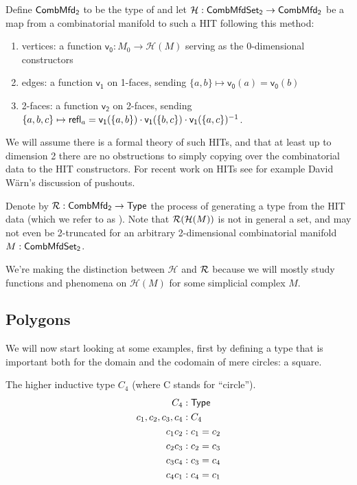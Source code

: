 \begin{mydef}
Define \( \mathsf{CombMfd_2} \) to be the type of  and let \( \mathcal{H}:\mathsf{CombMfdSet_2}\to\mathsf{CombMfd_2} \) be a map from a combinatorial manifold to such a HIT following this method:
\begin{enumerate}
\item vertices: a function \( \mathsf{v_0}:M_0\to \mathcal{H}(M) \) serving as the 0-dimensional constructors
\item edges: a function \( \mathsf{v_1} \) on 1-faces, sending \( \{a, b\}\mapsto \mathsf{v_0}(a)=\mathsf{v_0}(b) \)
\item 2-faces: a function \( \mathsf{v_2} \) on 2-faces, sending \( \{a, b, c\}\mapsto \mathsf{refl}_a = \mathsf{v_1}(\{a, b\})\cdot \mathsf{v_1}(\{b, c\})\cdot \mathsf{v_1}(\{a, c\})^{-1} \).
\end{enumerate}
\end{mydef}

We will assume there is a formal theory of such HITs, and that at least up to dimension 2 there are no obstructions to simply copying over the combinatorial data to the HIT constructors. For recent work on HITs see for example David Wärn's discussion of pushouts\cite{warn_pushouts}.

\begin{mydef}
Denote by \( \mathcal{R}:\mathsf{CombMfd_2}\to\mathsf{Type} \) the process of generating a type from the HIT data (which we refer to as ). Note that \( \mathcal{R}(\mathcal{H}(M)) \) is not in general a set, and may not even be 2-truncated for an arbitrary 2-dimensional combinatorial manifold \( M:\mathsf{CombMfdSet_2} \).
\end{mydef}

We're making the distinction between \( \mathcal{H} \) and \( \mathcal{R} \) because we will mostly study functions and phenomena on \( \mathcal{H}(M) \) for some simplicial complex \( M \).

\subsection{Polygons}\label{sec:polygons}

We will now start looking at some examples, first by defining a type that is important both for the domain and the codomain of mere circles: a square.

\begin{mydef}
The higher inductive type \( C_4 \) (where C stands for ``circle'').
\begin{align*}
C_4 &: \mathsf{Type} \\
c_1, c_2, c_3, c_4 &: C_4 \\
c_1c_2 &: c_1 = c_2 \\
c_2c_3 &: c_2 = c_3 \\
c_3c_4 &: c_3 = c_4 \\
c_4c_1 &: c_4 = c_1 \\
\end{align*}
\end{mydef}


